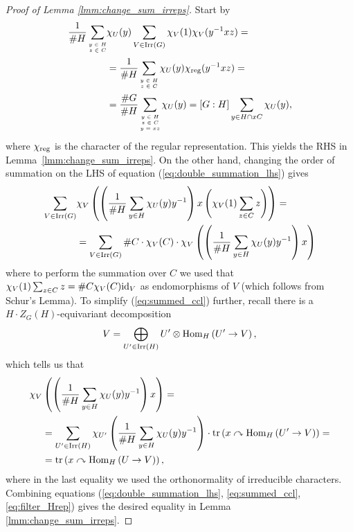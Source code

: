 \documentclass{amsart}
\newcommand{\Hom}[3][]{\tn{Hom}_{#1}\left(#2\to #3\right)}
\newcommand{\tn}{\textnormal}
\newcommand{\tr}{\operatorname{tr}}
\begin{document}
\begin{proof}[Proof of Lemma \ref{lmm:change_sum_irreps}]
Start by
\begin{align}\begin{split}\label{eq:double_summation_lhs}
\frac{1}{\#H}\sum_{\tiny\begin{matrix}y\in H\\z\in C\end{matrix}}&\chi_U(y)\sum_{V\in\tn{Irr}(G)}\chi_V(1)\chi_V(y^{-1}xz)=\\
&=\frac{1}{\#H}\sum_{\tiny\begin{matrix}y\in H\\z\in C\end{matrix}}\chi_U(y)\chi_\tn{reg}(y^{-1}xz)=\\
&=\frac{\#G}{\#H}\sum_{\tiny\begin{matrix}y\in H\\z\in C\\y=xz\end{matrix}}\chi_U(y)=[G:H]\sum_{y\in H\cap xC}\chi_U(y),
\end{split}\end{align}
where $\chi_\tn{reg}$ is the character of the regular representation. This yields the RHS in Lemma~\ref{lmm:change_sum_irreps}. On the other hand, changing the order of summation on the LHS of equation (\ref{eq:double_summation_lhs}) gives
\begin{align}\begin{split}\label{eq:summed_ccl}
\sum_{V\in\tn{Irr}(G)}&\chi_V\left(\left(\frac{1}{\#H}\sum_{y\in H}\chi_U(y)y^{-1}\right)x\left(\chi_V(1)\sum_{z\in C}z\right)\right)=\\
&=\sum_{V\in\tn{Irr}(G)}\#C\cdot\chi_V(C)\cdot\chi_V\left(\left(\frac{1}{\#H}\sum_{y\in H}\chi_U(y)y^{-1}\right)x\right)
\end{split}\end{align}
where to perform the summation over $C$ we used that $\chi_V(1)\sum_{z\in C}z=\#C\chi_V(C)\tn{id}_V$ as endomorphisms of $V$ (which follows from Schur's Lemma). To simplify (\ref{eq:summed_ccl}) further, recall there is a $H\cdot Z_G(H)$-equivariant decomposition
\begin{equation*}
V=\bigoplus_{U'\in\tn{Irr}(H)}U'\otimes\Hom[H]{U'}{V},
\end{equation*}
which tells us that
\begin{align}\begin{split}\label{eq:filter_Hrep}
\chi_V&\left(\left(\frac{1}{\#H}\sum_{y\in H}\chi_U(y)y^{-1}\right)x\right)=\\
&=\sum_{U'\in\tn{Irr}(H)}\chi_{U'}\left(\frac{1}{\#H}\sum_{y\in H}\chi_U(y)y^{-1}\right)\cdot\tr\left(x\curvearrowright\Hom[H]{U'}{V}\right)=\\
&=\tr\left(x\curvearrowright\Hom[H]{U}{V}\right),
\end{split}\end{align}
where in the last equality we used the orthonormality of irreducible characters. Combining equations (\ref{eq:double_summation_lhs}, \ref{eq:summed_ccl}, \ref{eq:filter_Hrep}) gives the desired equality in Lemma \ref{lmm:change_sum_irreps}.
\end{proof}
\end{document}
